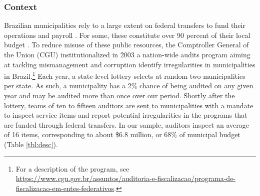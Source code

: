 \documentclass[12pt,a4paper]{article}
\theoremstyle{definition}
\begin{document}
\subsubsection*{Context}


Brazilian municipalities rely to a large extent on federal transfers to fund their operations and payroll \citep{arretche_politicas_1999}. For some, these constitute over 90 percent of their local budget \citep{prado_transferencias_2001}. To reduce misuse of these public resources, the Comptroller General of the Union (CGU) institutionalized in 2003 a nation-wide audits program aiming at tackling mismanagement and corruption identify irregularities in municipalities in Brazil.\footnote{For a description of the program, see \url{https://www.cgu.gov.br/assuntos/auditoria-e-fiscalizacao/programa-de-fiscalizacao-em-entes-federativos}.} Each year, a state-level lottery selects at random two municipalities per state. As such, a municipality has a 2\% chance of being audited on any given year and may be audited more than once over our period. Shortly after the lottery, teams of ten to fifteen auditors are sent to municipalities with a mandate to inspect service items and report potential irregularities in the programs that are funded through federal transfers. In our sample, auditors inspect an average of 16 items, corresponding to about \$6.8 million, or 68\% of municipal budget (Table \ref{tbl:desc}). 
\end{document}
